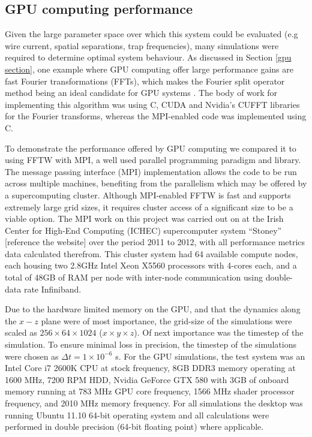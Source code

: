 
\subsection{GPU computing performance}
Given the large parameter space over which this system could be evaluated (e.g wire current, spatial separations, trap frequencies), many simulations were required to determine optimal system behaviour. As discussed in Section \ref{gpu section}, one example where GPU computing offer large performance gains are fast Fourier transformations (FFTs), which makes the Fourier split operator method being an ideal candidate for GPU systems \cite{Bauke:11}. The body of work for implementing this algorithm was using C, CUDA and Nvidia's CUFFT libraries for the Fourier transforms, whereas the MPI-enabled code was implemented using C.

To demonstrate the performance offered by GPU computing we compared it to using FFTW with MPI, a well used parallel programming paradigm and library. The message passing interface (MPI) implementation allows the code to be run across multiple machines, benefiting from the parallelism which may be offered by a supercomputing cluster. Although MPI-enabled FFTW is fast and supports extremely large grid sizes, it requires cluster access of a significant size to be a viable option. The MPI work on this project was carried out on at the Irish Center for High-End Computing (ICHEC) supercomputer system ``Stoney'' [reference the website] over the period 2011 to 2012, with all performance metrics data calculated therefrom. This cluster system had 64 available compute nodes, each housing two 2.8GHz Intel Xeon X5560 processors with 4-cores each, and a total of 48GB of RAM per node with inter-node communication using double-data rate Infiniband.

Due to the hardware limited memory on the GPU, and that the dynamics along the $x-z$ plane were of most importance, the grid-size of the simulations were scaled as $256\times 64\times1024$ ($x\times y\times z$). Of next importance was the timestep of the simulation.  To ensure minimal loss in precision, the timestep of the simulations were chosen as $\Delta t = 1\times 10^{-6}$ s. For the GPU simulations, the test system was an Intel Core i7 2600K CPU at stock frequency, 8GB DDR3 memory operating at 1600 MHz, 7200 RPM HDD, Nvidia GeForce GTX 580 with 3GB of onboard memory running at 783 MHz GPU core frequency, 1566 MHz shader processor frequency, and 2010 MHz memory frequency. For all simulations the desktop was running Ubuntu 11.10 64-bit operating system and all calculations were performed in double precision (64-bit floating point) where applicable.

